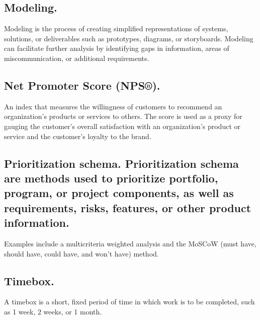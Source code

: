 \documentclass[11pt]{article}
\begin{document}
\subsection{Modeling.}
\label{sec:orgaa15db3}
Modeling is the process of creating simplified representations of systems, solutions, or deliverables such as prototypes, diagrams, or storyboards. Modeling can facilitate further analysis by identifying gaps in information, areas of miscommunication, or additional requirements.
\subsection{Net Promoter Score (NPS®).}
\label{sec:org4f8ec78}
An index that measures the willingness of customers to recommend an organization’s products or services to others. The score is used as a proxy for gauging the customer’s overall satisfaction with an organization’s product or service and the customer’s loyalty to the brand.
\subsection{Prioritization schema. Prioritization schema are methods used to prioritize portfolio, program, or project components, as well as requirements, risks, features, or other product information.}
\label{sec:org12d1d20}
Examples include a multicriteria weighted analysis and the MoSCoW (must have, should have, could have, and won’t have) method.
\subsection{Timebox.}
\label{sec:orgcf51d78}
A timebox is a short, fixed period of time in which work is to be completed, such as 1 week, 2 weeks, or 1 month.
\end{document}
